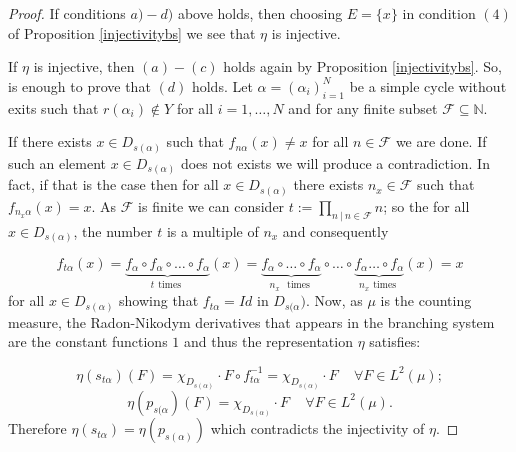 \documentclass[12pt, reqno]{amsart}
\theoremstyle{definition}
\theoremstyle{remark}
\numberwithin{equation}{section}
\begin{document}
\begin{proof}
 If conditions $a) - d)$ above holds, then choosing $E = \{x\}$ in condition $(4)$ of Proposition \ref{injectivitybs} we see that $\eta$ is injective.

If $\eta$ is injective, then $(a)-(c)$ holds again by Proposition \ref{injectivitybs}. So, is enough to prove that $(d)$ holds. Let $\alpha = (\alpha_i)_{i = 1}^N$ be a simple cycle without exits such that $r(\alpha_i) \notin Y$ for all $i = 1, \ldots, N$ and for any finite subset $\mathcal{F} \subseteq \mathbb{N}$. 

If there exists $x \in D_{s(\alpha)}$ such that $f_{n\alpha}(x) \neq x$ for all $n \in \mathcal{F}$ we are done. If such an element $x \in D_{s(\alpha)}$ does not exists we will produce a contradiction. In fact, if that is the case then for all $x \in D_{s(\alpha)}$ there exists $n_x \in \mathcal{F}$ such that $f_{n_x \alpha}(x) = x$. As $\mathcal{F}$ is finite we can consider $t:= {\displaystyle \prod_{n \ | \ n \in \mathcal{F}} n }$; so the for all $x \in D_{s(\alpha)}$, the number $t$ is a multiple of $n_x$ and consequently 

$$f_{t\alpha}(x) = \underbrace{f_{\alpha} \circ f_{\alpha} \circ \ldots \circ f_{\alpha}}_{t \,\ \textrm{times } } (x) = \underbrace{f_{\alpha} \circ \ldots \circ f_{\alpha}}_{n_x \,\ \textrm{ times } } \circ \ldots \circ \underbrace{ f_{\alpha} \ldots \circ f_{\alpha}}_{n_x \,\ \textrm{times } } (x) = x $$
for all $x \in D_{s(\alpha)}$ showing that $f_{t\alpha} = Id$ in $D_{s(\alpha})$. Now, as $\mu$ is the counting measure, the Radon-Nikodym derivatives that appears in the branching system are the constant functions $1$ and thus the representation $\eta$ satisfies:

$$\eta(s_{t\alpha})(F) = \chi_{D_{s(\alpha)}} \cdot F \circ f_{t \alpha}^{-1} = \chi_{D_{s(\alpha)}} \cdot F \,\ \,\ \,\ \forall F \in L^2(\mu);$$
$$\eta(p_{s(\alpha})(F) = \chi_{D_{s(\alpha)}} \cdot F \,\ \,\ \,\ \forall F \in L^2(\mu).$$
Therefore $\eta(s_{t\alpha}) = \eta(p_{s(\alpha)})$ which contradicts the injectivity of $\eta$.
\end{proof}



\end{document}
